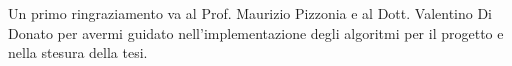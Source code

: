 Un primo ringraziamento va al Prof. Maurizio Pizzonia e al Dott. Valentino Di Donato per avermi guidato nell'implementazione degli algoritmi per il progetto e nella stesura della tesi.